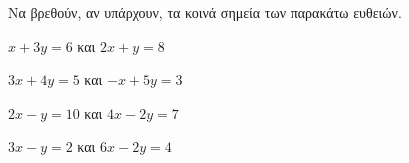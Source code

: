 Να βρεθούν, αν υπάρχουν, τα κοινά σημεία των παρακάτω ευθειών.
\begin{rlist}
\item $ x+3y=6 $ και $ 2x+y=8 $
\item $ 3x+4y=5 $ και $ -x+5y=3 $
\item $ 2x-y=10 $ και $ 4x-2y=7 $
\item $ 3x-y=2 $ και $ 6x-2y=4 $
\end{rlist}
